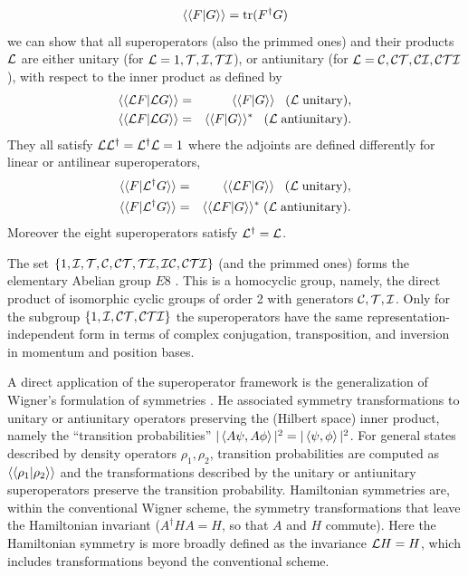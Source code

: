 \begin{equation}
  \langle\langle F|G\rangle\rangle={\rm{tr}} (F^\dagger G)
  \label{eq:chapter1_innerProduct}
\end{equation}
%
we can show that all superoperators (also the primmed ones) and their products ${\cal L}$ are either unitary (for ${\cal L}=1,{\cal T},{\cal I},{\cal TI}$), or antiunitary (for ${\cal L}={\cal C}, {\cal CT},{\cal CI},{\cal CTI}$), with respect to the inner product as defined by
%
\begin{eqnarray}
	\langle\langle {\cal L}F| {\cal L}G\rangle\rangle&=& \langle\langle F| G\rangle\rangle\;\;\;  ({\cal L}\; {\rm unitary}),
	\\
	\langle\langle {\cal L}F| {\cal L} G\rangle\rangle&=& \langle\langle  F| G\rangle\rangle^*\;\;\;  ({\cal L}\; {\rm antiunitary}).
\end{eqnarray}
%
They all satisfy ${\cal L}{\cal L}^\dagger={\cal L}^\dagger {\cal L}=1$
where the adjoints are defined differently for linear or antilinear superoperators,
\begin{eqnarray}
	\langle\langle F| {\cal L}^\dagger G\rangle\rangle&=& \langle\langle {\cal L} F| G\rangle\rangle\;\;\;  ({\cal L}\; {\rm unitary}),
	\\
	\langle\langle F| {\cal L}^\dagger G\rangle\rangle&=& \langle\langle {\cal L} F| G\rangle\rangle^*\;  ({\cal L}\; {\rm antiunitary}).
\end{eqnarray}
%
Moreover the eight superoperators  satisfy ${\cal L}^\dagger={\cal L}$.

The set $\{1, \cal{I,T,C,CT,TI,IC,CTI}\}$ (and the primmed ones) forms the elementary Abelian group $E8$ \cite{Rose2009}. This is a homocyclic group, namely, the direct product of isomorphic
cyclic groups of order 2 with generators $\cal{C,T,I}$. Only for the subgroup $\{1, \cal{I,CT,CTI}\}$ the superoperators have the same representation-independent form in terms of complex conjugation, transposition, and inversion in momentum and position bases.

A direct application of the superoperator framework is the generalization of Wigner's
formulation of symmetries \cite{Wigner1959}. He associated symmetry transformations to unitary or antiunitary operators preserving the (Hilbert space) inner product, namely the ``transition probabilities'' $|\expval{A\psi,A\phi}|^2=|\expval{\psi,\phi}|^2$.
For general states described by density operators $\rho_1,\rho_2$, transition probabilities are computed as $\langle\langle \rho_1|\rho_2\rangle\rangle$
and the transformations described by the unitary or antiunitary superoperators preserve the
transition probability. Hamiltonian symmetries are, within the conventional Wigner scheme, the  symmetry transformations that leave the Hamiltonian invariant ($A^\dagger H A=H$, so that $A$ and $H$ commute). Here the Hamiltonian symmetry is more broadly defined  as
the invariance ${\cal L}H=H$, which includes transformations  beyond the conventional scheme.

